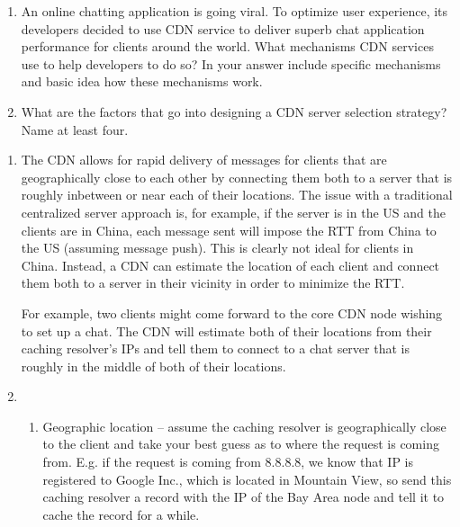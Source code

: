 \documentclass{report}
\begin{document}
\clearpage
\begin{problem}

  \begin{enumerate}
  \item An online chatting application is going viral.
        To optimize user experience, its developers decided to use CDN service
        to deliver superb chat application performance for clients around the
        world. What mechanisms CDN services use to help developers to do so?
        In your answer include specific mechanisms and basic idea how these
        mechanisms work.

  \item What are the factors that go into designing a CDN server selection
        strategy? Name at least four.
  \end{enumerate}

\begin{answer}{24em}
  \begin{enumerate}
  \item The CDN allows for rapid delivery of messages for clients that are
        geographically close to each other by connecting them both to a server
        that is roughly inbetween or near each of their locations. The issue
        with a traditional centralized server approach is, for example, if the
        server is in the US and the clients are in China, each message sent
        will impose the RTT from China to the US (assuming message push). This
        is clearly not ideal for clients in China. Instead, a CDN can estimate
        the location of each client and connect them both to a server in their
        vicinity in order to minimize the RTT.

        For example, two clients might come forward to the core CDN node
        wishing to set up a chat. The CDN will estimate both of their locations
        from their caching resolver's IPs and tell them to connect to a chat
        server that is roughly in the middle of both of their locations.
  \item
    \begin{enumerate}
    \item Geographic location -- assume the caching resolver is geographically
          close to the client and take your best guess as to where the request
          is coming from. E.g. if the request is coming from 8.8.8.8, we know
          that IP is registered to Google Inc., which is located in Mountain
          View, so send this caching resolver a record with the IP of the Bay
          Area node and tell it to cache the record for a while.


\end{enumerate}
\end{enumerate}
\end{answer}
\end{problem}
\end{document}
